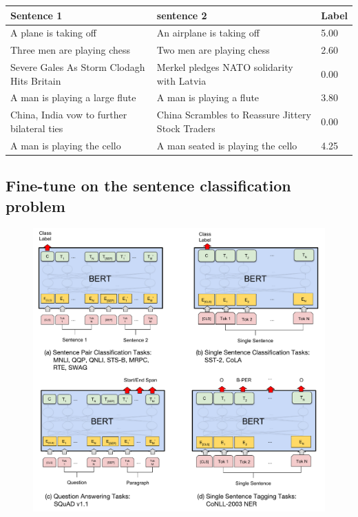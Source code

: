 \documentclass[final,letterpaper,twoside,12pt]{report}
\begin{document}
\begin{center}
	\begin{tabular}{|p{6cm}|p{6cm}|p{1.5cm}|}
		\hline
		Sentence 1                                 & sentence 2                                        & Label \\
		\hline
		A plane is taking off                      & An airplane is taking off                         & 5.00  \\
		\hline
		Three men are playing chess                & Two men are playing chess                         & 2.60  \\
		\hline
		Severe Gales As Storm Clodagh Hits Britain & Merkel pledges NATO solidarity with Latvia        & 0.00  \\
		\hline
		A man is playing a large flute             &
		A man is playing a flute                   & 3.80                                                      \\
		\hline
		China, India vow to further bilateral ties & China Scrambles to Reassure Jittery Stock Traders & 0.00  \\
		\hline
		A man is playing the cello                 & A man seated is playing the cello                 & 4.25  \\
		\hline
	\end{tabular}
\end{center}

\newpage

\subsection{Fine-tune on the sentence classification problem}

\begin{figure}[h]
	\begin{center}
		\includegraphics[trim=440 470 0 0, clip,width=1\textwidth]{BERT_fine_tune.pdf}
	\end{center}
\end{figure}
\end{document}
